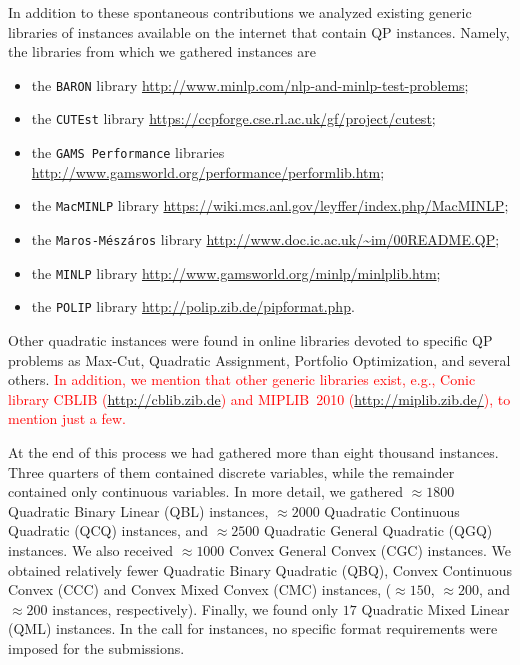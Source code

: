 In addition to these spontaneous contributions we analyzed existing generic
libraries of instances available  on the internet that contain QP
instances. Namely, the libraries from which we gathered instances are
%
\begin{itemize}
 \item the \texttt{BARON} library
 \url{http://www.minlp.com/nlp-and-minlp-test-problems};
%
\item the \texttt{CUTEst} library
 \url{https://ccpforge.cse.rl.ac.uk/gf/project/cutest};
%
\item the \texttt{GAMS Performance} libraries
 \url{http://www.gamsworld.org/performance/performlib.htm};
%
\item the \texttt{MacMINLP} library
 \url{https://wiki.mcs.anl.gov/leyffer/index.php/MacMINLP};
%
\item the \texttt{Maros-M{\'e}sz{\'a}ros} library
 \url{http://www.doc.ic.ac.uk/~im/00README.QP};
%
\item the \texttt{MINLP} library
 \url{http://www.gamsworld.org/minlp/minlplib.htm};
%
\item the \texttt{POLIP} library
 \url{http://polip.zib.de/pipformat.php}.
\end{itemize}

Other quadratic instances were found in online libraries devoted to
specific QP problems as Max-Cut, Quadratic Assignment, Portfolio
Optimization, and several others. \textcolor{red}{In addition, we mention
that other generic libraries exist, e.g., 
Conic library CBLIB (\url{http://cblib.zib.de}) and 
MIPLIB~2010 (\url{http://miplib.zib.de/}), to mention just a few.}

At the end of this process we had gathered more than eight thousand
instances. Three quarters of them contained discrete variables, while
the remainder contained only continuous variables. In more detail,
we gathered $\approx 1800$ Quadratic Binary Linear (QBL) instances,
$\approx 2000$ Quadratic Continuous Quadratic (QCQ) instances,
and $\approx 2500$ Quadratic General Quadratic (QGQ) instances. We
also received $\approx 1000$ Convex General Convex (CGC) instances. We
obtained relatively fewer Quadratic Binary Quadratic (QBQ), Convex
Continuous Convex (CCC) and Convex Mixed Convex (CMC) instances,
($\approx 150$, $\approx 200$, and $\approx 200$ instances, respectively).
Finally, we found only $17$ Quadratic Mixed
Linear (QML) instances. In the call for instances, no specific format
requirements were imposed for the submissions.

